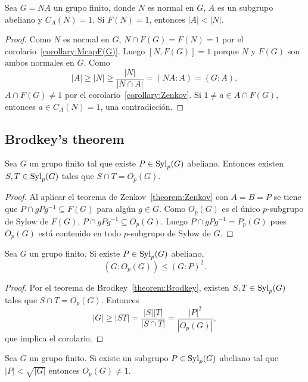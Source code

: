 \begin{corollary}
	Sea $G=NA$ un grupo finito, donde $N$ es normal en $G$, $A$ es un subgrupo
	abeliano y $C_A(N)=1$.  Si $F(N)=1$, entonces $|A|<|N|$. 
\end{corollary}

\begin{proof}
	Como $N$ es normal en $G$, 
	$N\cap F(G)=F(N)=1$ por 
	el corolario~\ref{corollary:McapF(G)}. Luego $[N,F(G)]=1$ porque
	$N$ y $F(G)$ son ambos normales en $G$.  Como 
	\[
	|A|\geq |N|\geq \frac{|N|}{|N\cap A|}=(NA:A)=(G:A),
	\]
	$A\cap F(G)\ne 1$ por el corolario~\ref{corollary:Zenkov}. Si $1\ne a\in
	A\cap F(G)$, entonces $a\in C_A(N)=1$, una contradicción.
\end{proof}

\subsection{Brodkey's theorem}

\begin{theorem}[Brodkey]
	\label{theorem:Brodkey}
	Sea $G$ un grupo finito tal que existe $P\in\mathrm{Syl}_p(G)$ abeliano. Entonces
	existen $S,T\in\mathrm{Syl}_p(G)$ tales que $S\cap T=O_p(G)$.
\end{theorem}

\begin{proof}
	Al aplicar el teorema de Zenkov~\ref{theorem:Zenkov} con $A=B=P$ se tiene
	que $P\cap gPg^{-1}\subseteq F(G)$ para algún $g\in G$. Como $O_p(G)$ es el
	único $p$-subgrupo de Sylow de $F(G)$, $P\cap gPg^{-1}\subseteq O_p(G)$.
	Luego $P\cap gPg^{-1}=P_p(G)$ pues $O_p(G)$ está contenido en todo
	$p$-subgrupo de Sylow de $G$.
\end{proof}

\begin{corollary}
	\label{corollary:GP2}
	Sea $G$ un grupo finito. Si existe $P\in \mathrm{Syl}_p(G)$ abeliano,
	\[
	(G:O_p(G))\leq (G:P)^2. 
	\]
\end{corollary}

\begin{proof}
	Por el teorema de Brodkey~\ref{theorem:Brodkey}, existen $S,T\in\mathrm{Syl}_p(G)$
	tales que $S\cap T=O_p(G)$. Entonces
	\[
		|G|\geq |ST|=\frac{|S||T|}{|S\cap T|}=\frac{|P|^2}{|O_p(G)|},
	\]
	que implica el corolario.
\end{proof}

\begin{corollary}
	Sea $G$ un grupo finito. Si existe un subgrupo $P\in\mathrm{Syl}_p(G)$ abeliano tal que
	$|P|<\sqrt{|G|}$ entonces $O_p(G)\ne1$.
\end{corollary}

